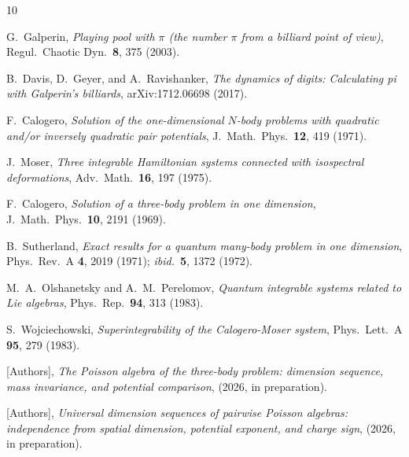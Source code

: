 \documentclass[aps,prl,twocolumn,superscriptaddress,showpacs]{revtex4-2}
\begin{document}
\begin{thebibliography}{10}

G.~Galperin,
\textit{Playing pool with $\pi$ (the number $\pi$ from a billiard
point of view)},
Regul.\ Chaotic Dyn.\ \textbf{8}, 375 (2003).

B.~Davis, D.~Geyer, and A.~Ravishanker,
\textit{The dynamics of digits: Calculating pi with Galperin's
billiards},
arXiv:1712.06698 (2017).

F.~Calogero,
\textit{Solution of the one-dimensional $N$-body problems with
quadratic and/or inversely quadratic pair potentials},
J.\ Math.\ Phys.\ \textbf{12}, 419 (1971).

J.~Moser,
\textit{Three integrable Hamiltonian systems connected with isospectral
deformations},
Adv.\ Math.\ \textbf{16}, 197 (1975).

F.~Calogero,
\textit{Solution of a three-body problem in one dimension},
J.\ Math.\ Phys.\ \textbf{10}, 2191 (1969).

B.~Sutherland,
\textit{Exact results for a quantum many-body problem in one
dimension},
Phys.\ Rev.\ A \textbf{4}, 2019 (1971);
\textit{ibid.}\ \textbf{5}, 1372 (1972).

M.~A.~Olshanetsky and A.~M.~Perelomov,
\textit{Quantum integrable systems related to Lie algebras},
Phys.\ Rep.\ \textbf{94}, 313 (1983).

S.~Wojciechowski,
\textit{Superintegrability of the Calogero-Moser system},
Phys.\ Lett.\ A \textbf{95}, 279 (1983).

[Authors],
\textit{The Poisson algebra of the three-body problem:
dimension sequence, mass invariance, and potential comparison},
(2026, in preparation).

[Authors],
\textit{Universal dimension sequences of pairwise Poisson algebras:
independence from spatial dimension, potential exponent, and charge
sign},
(2026, in preparation).

\end{thebibliography}
\end{document}
